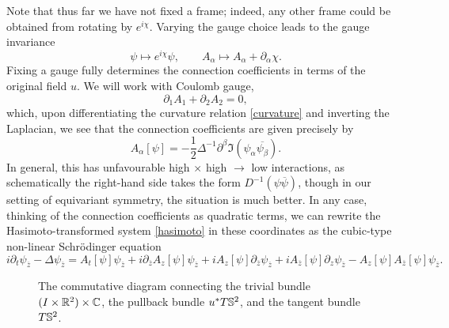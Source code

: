 Note that thus far we have not fixed a frame; indeed, any other frame could be obtained from rotating by $e^{i \chi}$. Varying the gauge choice leads to the gauge invariance
    \[
        \psi \mapsto e^{i \chi} \psi, \qquad A_\alpha \mapsto A_\alpha + \partial_\alpha \chi. 
    \]
Fixing a gauge fully determines the connection coefficients in terms of the original field $u$. We will work with Coulomb gauge, 
    \begin{equation}\label{eq:coulomb}
        \partial_1 A_1 + \partial_2 A_2 = 0,
    \end{equation}
which, upon differentiating the curvature relation \eqref{curvature} and inverting the Laplacian, we see that the connection coefficients are given precisely by 
    \begin{equation}\label{eq:coefficients}
        A_\alpha [\psi] 
            = -\frac12 \Delta^{-1} \partial^\beta \Im(\psi_\alpha \overline{\psi_\beta}). 
    \end{equation}
In general, this has unfavourable high $\times$ high $\to$ low interactions, as schematically the right-hand side takes the form $D^{-1} (\psi \overline \psi)$, though in our setting of equivariant symmetry, the situation is much better. In any case, thinking of the connection coefficients as quadratic terms, we can rewrite the Hasimoto-transformed system \eqref{hasimoto} in these coordinates as the cubic-type non-linear Schr\"odinger equation 
    \begin{equation}
        i\partial_t \psi_{\overline z} - \Delta \psi_{\overline z} 
            = A_t [\psi] \psi_{\overline z} + i \partial_{\overline z} A_z[\psi] \psi_{\overline z} + i A_z [\psi] \partial_{\overline z} \psi_{\overline z} + i A_{\overline z} [\psi] \partial_z \psi_{\overline z} - A_z [\psi] A_{\overline z}[\psi] \psi_{\overline z}. 
    \end{equation}



\begin{figure}[h]
    \begin{center}
            \caption{The commutative diagram connecting the trivial bundle $(I \times \mathbb R^2) \times \mathbb C$, the pullback bundle $u^* T\mathbb S^2$, and the tangent bundle $T\mathbb S^2$. }
    \end{center}
\end{figure}



